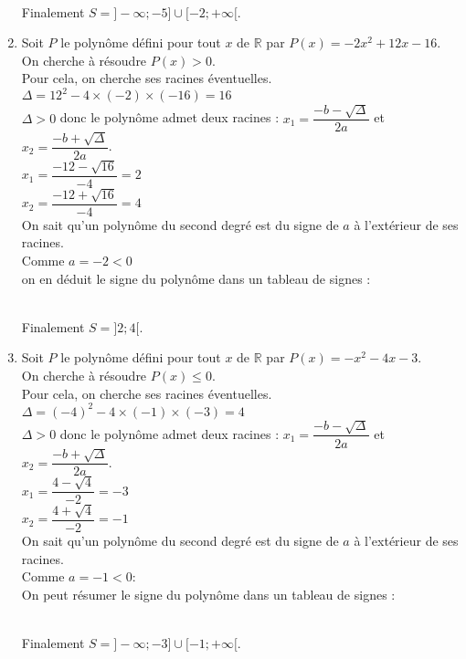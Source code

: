 \documentclass[a4paper,11pt,exos]{nsi} %
\begin{document}
\begin{enumerate}[itemsep=1em]
        \\[.5em]
        Finalement $S=]-\infty;-5]\cup[-2;+\infty[$.
        \item Soit $P$ le polynôme défini pour tout $x$ de $\mathbb R$ par $P(x)=-2x^2+12x-16$.\\On cherche à résoudre $P(x)>0$.\\Pour cela, on cherche ses racines éventuelles.\\$\Delta = 12^2-4\times(-2)\times(-16)=16$\\$\Delta>0$ donc le polynôme admet deux racines : $x_1 = \dfrac{-b-\sqrt{\Delta}}{2a}$ et $x_2 = \dfrac{-b+\sqrt{\Delta}}{2a}$.\\$x_1 =\dfrac{-12-\sqrt{16}}{-4}=2$\\$x_2 =\dfrac{-12+\sqrt{16}}{-4}=4$\\On sait qu'un polynôme du second degré est du signe de $a$ à l'extérieur de ses racines.\\Comme $a=-2<0$\\on en déduit le signe du polynôme dans un tableau de signes :\\
        \\[.5em]
        Finalement $S=]2;4[$.
        \item Soit $P$ le polynôme défini pour tout $x$ de $\mathbb R$ par $P(x)=-x^2-4x-3$.\\On cherche à résoudre $P(x)\leq 0$.\\Pour cela, on cherche ses racines éventuelles.\\$\Delta = (-4)^2-4\times(-1)\times(-3)=4$\\$\Delta>0$ donc  le polynôme admet deux racines : $x_1 = \dfrac{-b-\sqrt{\Delta}}{2a}$ et $x_2 = \dfrac{-b+\sqrt{\Delta}}{2a}$.\\$x_1 =\dfrac{4-\sqrt{4}}{-2}=-3$\\$x_2 =\dfrac{4+\sqrt{4}}{-2}=-1$\\On sait qu'un polynôme du second degré est du signe de $a$ à l'extérieur de ses racines.\\Comme $a=-1<0 :$\\On peut résumer le signe du polynôme dans un tableau de signes :\\
        \\[.5em]
        Finalement $S=]-\infty;-3]\cup[-1;+\infty[$.
        \end{enumerate}
\end{document}
